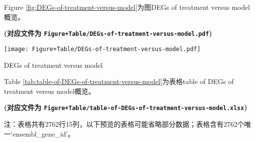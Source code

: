 \documentclass[
]{article}
\begin{document}
Figure \ref{fig:DEGs-of-treatment-versus-model}为图DEGs of treatment versus model概览。

\textbf{(对应文件为 \texttt{Figure+Table/DEGs-of-treatment-versus-model.pdf})}

\def\@captype{figure}
\begin{center}
\texttt{[image: Figure+Table/DEGs-of-treatment-versus-model.pdf]}
\caption{DEGs of treatment versus model}\label{fig:DEGs-of-treatment-versus-model}
\end{center}

Table \ref{tab:table-of-DEGs-of-treatment-versus-model}为表格table of DEGs of treatment versus model概览。

\textbf{(对应文件为 \texttt{Figure+Table/table-of-DEGs-of-treatment-versus-model.xlsx})}

\begin{center}\begin{tcolorbox}[colback=gray!10, colframe=gray!50, width=0.9\linewidth, arc=1mm, boxrule=0.5pt]注：表格共有2762行15列，以下预览的表格可能省略部分数据；表格含有2762个唯一`ensembl\_gene\_id'。
\end{tcolorbox}
\end{center}
\end{document}
